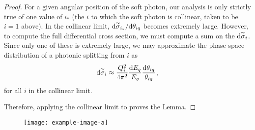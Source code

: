 \begin{proof}
    For a given angular position of the soft photon, our analysis is only strictly true of one value of \(i_*\) (the \(i\) to which the soft photon is collinear, taken to be \(i=1\) above).
    In the collinear limit, \(\dd\overset{\sim}{\sigma}_{i_*}/\dd\theta_{iq}\) becomes extremely large.
    However, to compute the full differential cross section, we must compute a sum on the \(\dd\overset{\sim}{\sigma}_i\).
    Since only one of these is extremely large, we may approximate the phase space distribution of a photonic splitting from \(i\) as
     \begin{align}
         \label{eq:collinear-photon-emission}
        \dsigmatilde_i
        \approx
        \frac{Q_i^2}{4\pi^2}
        \frac{\dd E_q}{E_q}
        \frac{\dd\theta_{iq}}{\theta_{iq}}
        \,,
    \end{align}
    for all \(i\) in the collinear limit.

    Therefore, applying the collinear limit to  proves the Lemma.
\end{proof}


\begin{figure}[]
    \centering
    \texttt{[image: example-image-a]}
    \caption{%
    }
    \label{fig:qed-coherent-branching}
\end{figure}



\vspace{7pt}

